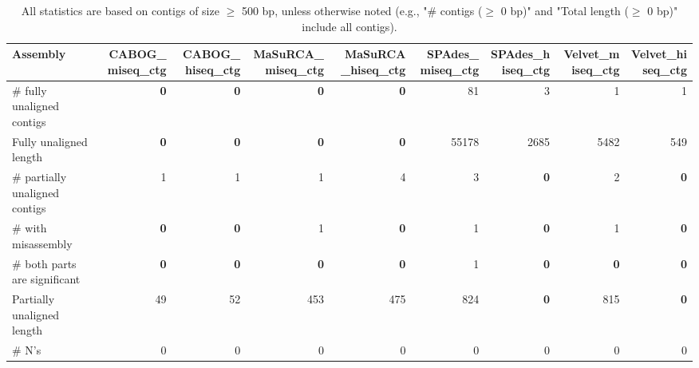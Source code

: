 \documentclass[12pt,a4paper]{article}
\begin{document}
\begin{table}[ht]
\begin{center}
\caption{All statistics are based on contigs of size $\geq$ 500 bp, unless otherwise noted (e.g., "\# contigs ($\geq$ 0 bp)" and "Total length ($\geq$ 0 bp)" include all contigs).}
\begin{tabular}{|l*{8}{|r}|}
\hline
Assembly & CABOG\_miseq\_ctg & CABOG\_hiseq\_ctg & MaSuRCA\_miseq\_ctg & MaSuRCA\_hiseq\_ctg & SPAdes\_miseq\_ctg & SPAdes\_hiseq\_ctg & Velvet\_miseq\_ctg & Velvet\_hiseq\_ctg \\ \hline
\# fully unaligned contigs & {\bf 0} & {\bf 0} & {\bf 0} & {\bf 0} & 81 & 3 & 1 & 1 \\ \hline
Fully unaligned length & {\bf 0} & {\bf 0} & {\bf 0} & {\bf 0} & 55178 & 2685 & 5482 & 549 \\ \hline
\# partially unaligned contigs & 1 & 1 & 1 & 4 & 3 & {\bf 0} & 2 & {\bf 0} \\ \hline
\hspace{5mm}\# with misassembly & {\bf 0} & {\bf 0} & 1 & {\bf 0} & 1 & {\bf 0} & 1 & {\bf 0} \\ \hline
\hspace{5mm}\# both parts are significant & {\bf 0} & {\bf 0} & {\bf 0} & {\bf 0} & 1 & {\bf 0} & {\bf 0} & {\bf 0} \\ \hline
Partially unaligned length & 49 & 52 & 453 & 475 & 824 & {\bf 0} & 815 & {\bf 0} \\ \hline
\# N's & 0 & 0 & 0 & 0 & 0 & 0 & 0 & 0 \\ \hline
\end{tabular}
\end{center}
\end{table}
\end{document}
